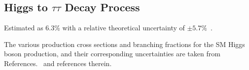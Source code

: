 \subsection{Higgs to $\tau\tau$ Decay Process}

Estimated as 6.3\% with a relative theoretical uncertainty of $\pm5.7\%$~\cite{deFlorian:2016spz}.




The various production cross sections and branching fractions for the SM Higgs 
boson production, and their corresponding uncertainties are taken from 
References.~\cite{deFlorian:2016spz,Denner:2011mq,Ball:2011mu} and references therein.













